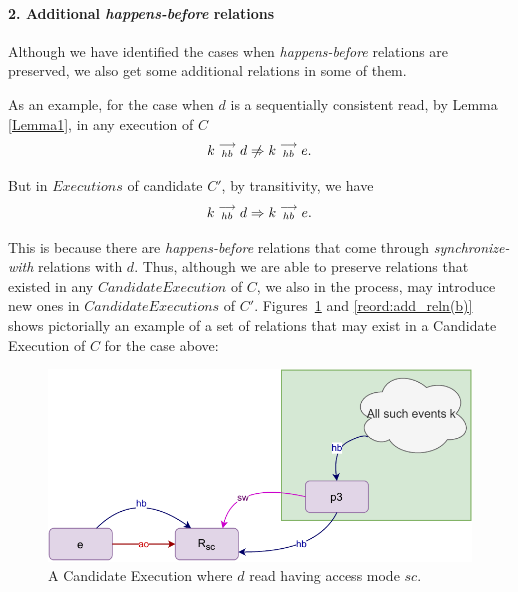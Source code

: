 
\paragraph{2. Additional \textit{happens-before} relations}
    Although we have identified the cases when \textit{happens-before} relations are preserved, we also get some additional relations in some of them.

    As an example, for the case when $d$ is a sequentially consistent read, by Lemma \ref{Lemma1}, in any execution of $C$
    \[
        \reln{k}{hb}{d} \centernot\Rightarrow \reln{k}{hb}{e}. 
    \]

    But in $Executions$ of candidate $C'$, by transitivity, we have 
    \[
        k\stackrel{\longrightarrow}{_{hb}}d \Rightarrow k\stackrel{\longrightarrow}{_{hb}}e. 
    \]

    This is because there are \textit{happens-before} relations that come through \textit{synchronize-with} relations with $d$. 
    Thus, although we are able to preserve relations that existed in any $Candidate Execution$ of $C$, we also in the process, may introduce new ones in $Candidate Executions$ of $C'$. 
    Figures~\ref{reord:add_reln(a)} and \ref{reord:add_reln(b)} shows pictorially an example of a set of relations that may exist in a  Candidate Execution of $C$ for the case above: 
    \begin{figure}[H]
        \centering
        \includegraphics[scale=0.7]{4.InstructionReordering/4.ValidReorderingCandidate/ProofParts/Part2/part2(c).pdf}
        \caption{A Candidate Execution where $d$ read having access mode $sc$.}
        \label{reord:add_reln(a)}
    \end{figure}


